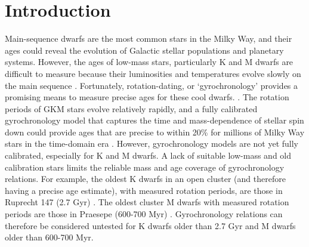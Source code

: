 \section{Introduction}

Main-sequence dwarfs are the most common stars in the Milky Way, and their
ages could reveal the evolution of Galactic stellar populations and planetary
systems.
However, the ages of low-mass stars, particularly K and M dwarfs are difficult
to measure because their luminosities and temperatures evolve slowly on the
main sequence \citep[see][for a review of stellar ages]{soderblom2010}.
Fortunately, rotation-dating, or `gyrochronology’ provides a promising means
to measure precise ages for these cool dwarfs.
\citep[\eg][]{schatzman1962, weber1967, kraft1967, skumanich1972, kawaler1988,
pinsonneault1989, barnes2003, barnes2007, mamajek2008, barnes2010, meibom2011,
epstein2014, meibom2015, vansaders2016, vansaders2018, claytor2020}.
The rotation periods of GKM stars evolve relatively rapidly, and a fully
calibrated gyrochronology model that captures the time and mass-dependence of
stellar spin down could provide ages that are precise to within 20\% for
millions of Milky Way stars in the time-domain era \citep{epstein2014,
najita2016, angus2019, claytor2020}.
However, gyrochronology models are not yet fully calibrated, especially for
K and M dwarfs.
A lack of suitable low-mass and old calibration stars limits the reliable mass
and age coverage of gyrochronology relations.
For example, the oldest K dwarfs in an open cluster (and therefore having a
precise age estimate), with measured rotation periods, are those in Ruprecht
147 (2.7 Gyr) \citep{curtis2020, age_citation}.
The oldest cluster M dwarfs with measured rotation periods are those in
Praesepe (600-700 Myr) \citep{douglas2017, rebull2017, age_citation}.
Gyrochronology relations can therefore be considered untested for K dwarfs
older than 2.7 Gyr and M dwarfs older than 600-700 Myr.

